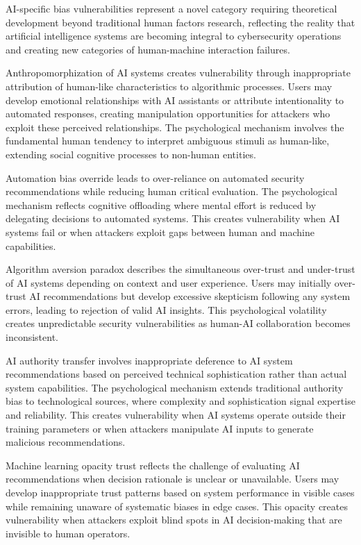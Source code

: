 \documentclass[11pt,a4paper]{article}
\begin{document}
AI-specific bias vulnerabilities represent a novel category requiring theoretical development beyond traditional human factors research, reflecting the reality that artificial intelligence systems are becoming integral to cybersecurity operations and creating new categories of human-machine interaction failures.

Anthropomorphization of AI systems creates vulnerability through inappropriate attribution of human-like characteristics to algorithmic processes. Users may develop emotional relationships with AI assistants or attribute intentionality to automated responses, creating manipulation opportunities for attackers who exploit these perceived relationships. The psychological mechanism involves the fundamental human tendency to interpret ambiguous stimuli as human-like, extending social cognitive processes to non-human entities.

Automation bias override leads to over-reliance on automated security recommendations while reducing human critical evaluation. The psychological mechanism reflects cognitive offloading where mental effort is reduced by delegating decisions to automated systems. This creates vulnerability when AI systems fail or when attackers exploit gaps between human and machine capabilities.

Algorithm aversion paradox describes the simultaneous over-trust and under-trust of AI systems depending on context and user experience. Users may initially over-trust AI recommendations but develop excessive skepticism following any system errors, leading to rejection of valid AI insights. This psychological volatility creates unpredictable security vulnerabilities as human-AI collaboration becomes inconsistent.

AI authority transfer involves inappropriate deference to AI system recommendations based on perceived technical sophistication rather than actual system capabilities. The psychological mechanism extends traditional authority bias to technological sources, where complexity and sophistication signal expertise and reliability. This creates vulnerability when AI systems operate outside their training parameters or when attackers manipulate AI inputs to generate malicious recommendations.

Machine learning opacity trust reflects the challenge of evaluating AI recommendations when decision rationale is unclear or unavailable. Users may develop inappropriate trust patterns based on system performance in visible cases while remaining unaware of systematic biases in edge cases. This opacity creates vulnerability when attackers exploit blind spots in AI decision-making that are invisible to human operators.
\end{document}
